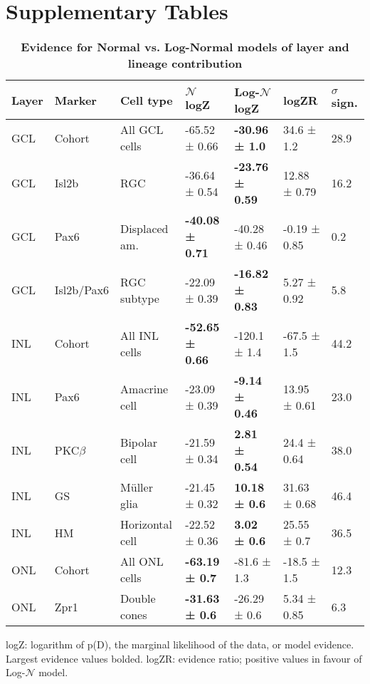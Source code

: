 \FloatBarrier

\section{Supplementary Tables}
\FloatBarrier

\begin{table}[!ht]
    \caption{{\bf Evidence for Normal vs. Log-Normal models of layer and lineage contribution}}
    \begin{tabular}{|l|l|l|l|l|l|l|} 
        \hline
        {\bf Layer} & {\bf Marker} & {\bf Cell type} & {\bf $\mathcal{N}$ logZ} & {\bf Log-$\mathcal{N}$ logZ} & {\bf logZR} & {\bf $\sigma$ sign.}\\ \hline \hline
        GCL & Cohort & All GCL cells &  -65.52 ± 0.66 & {\bf -30.96 ± 1.0} & 34.6 ± 1.2 & 28.9\\ \hline
        GCL & Isl2b & RGC & -36.64 ± 0.54 & {\bf -23.76 ± 0.59} & 12.88 ± 0.79 & 16.2\\ \hline
        GCL & Pax6 & Displaced am. & {\bf -40.08 ± 0.71} & -40.28 ± 0.46 & -0.19 ± 0.85 & 0.2\\ \hline
        GCL & Isl2b/Pax6 & RGC subtype & -22.09 ± 0.39 & {\bf -16.82 ± 0.83} & 5.27 ± 0.92 & 5.8\\ \hline \hline
        INL & Cohort & All INL cells & {\bf -52.65 ± 0.66} & -120.1 ± 1.4 & -67.5 ± 1.5 & 44.2\\ \hline
        INL & Pax6 & Amacrine cell & -23.09 ± 0.39 & {\bf -9.14 ± 0.46} & 13.95 ± 0.61 & 23.0\\ \hline
        INL & PKC$\beta$ & Bipolar cell & -21.59 ± 0.34 & {\bf 2.81 ± 0.54} & 24.4 ± 0.64 & 38.0\\ \hline
        INL & GS & M\"{u}ller glia & -21.45 ± 0.32 & {\bf 10.18 ± 0.6} & 31.63 ± 0.68 & 46.4\\ \hline
        INL & HM & Horizontal cell & -22.52 ± 0.36 & {\bf 3.02 ± 0.6} & 25.55 ± 0.7 & 36.5\\ \hline \hline
        ONL & Cohort & All ONL cells &{\bf -63.19 ± 0.7} & -81.6 ± 1.3 & -18.5 ± 1.5 & 12.3\\ \hline
        ONL & Zpr1 & Double cones &  {\bf -31.63 ± 0.6} & -26.29 ± 0.6 & 5.34 ± 0.85 & 6.3\\ \hline
    \end{tabular}
    \begin{flushleft}logZ: logarithm of p(D), the marginal likelihood of the data, or model evidence.  Largest evidence values bolded. logZR: evidence ratio; positive values in favour of Log-$\mathcal{N}$ model.
    \end{flushleft}
    \label{lineage_nlnev}
\end{table}


